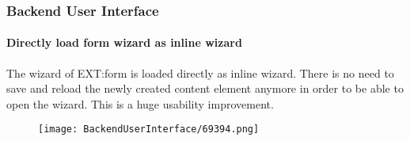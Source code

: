 \begin{frame}[fragile]
	\frametitle{Backend User Interface}
	\framesubtitle{Directly load form wizard as inline wizard}

	The wizard of EXT:form is loaded directly as inline wizard.
	There is no need to save and reload the newly created content element anymore
	in order to be able to open the wizard. This is a huge usability improvement.

	\begin{figure}
		\texttt{[image: BackendUserInterface/69394.png]}
	\end{figure}

\end{frame}

